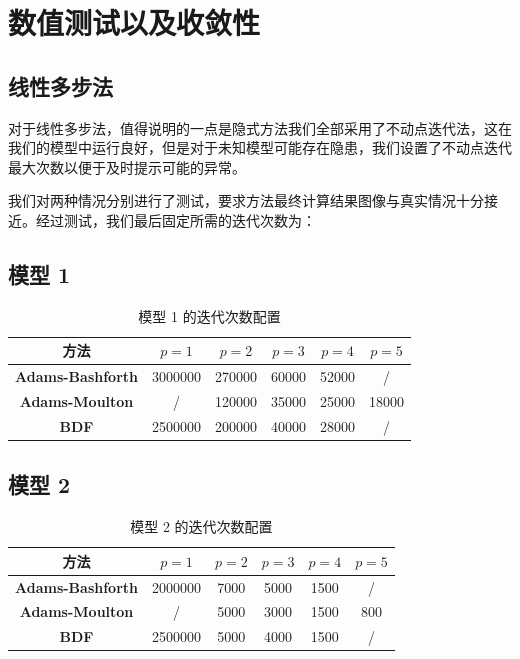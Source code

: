 \documentclass[a4paper]{ctexart} %
\begin{document}
\section{数值测试以及收敛性}
\subsection{线性多步法}
对于线性多步法，值得说明的一点是隐式方法我们全部采用了不动点迭代法，这在我们的模型中运行良好，但是对于未知模型可能存在隐患，我们设置了不动点迭代最大次数以便于及时提示可能的异常。

我们对两种情况分别进行了测试，要求方法最终计算结果图像与真实情况十分接近。经过测试，我们最后固定所需的迭代次数为：

\subsection*{模型 1}
\begin{table}[h!]
\centering
\begin{tabular}{|c|c|c|c|c|c|}
\hline
\textbf{方法} & $p=1$ & $p=2$ & $p=3$ & $p=4$ & $p=5$ \\ \hline
\textbf{Adams-Bashforth} & 3000000 & 270000 & 60000 & 52000 & / \\ \hline
\textbf{Adams-Moulton} & / & 120000 & 35000 & 25000 & 18000 \\ \hline
\textbf{BDF} & 2500000 & 200000 & 40000 & 28000 & / \\ \hline
\end{tabular}
\caption{模型 1 的迭代次数配置}
\end{table}

\subsection*{模型 2}
\begin{table}[h!]
\centering
\begin{tabular}{|c|c|c|c|c|c|}
\hline
\textbf{方法} & $p=1$ & $p=2$ & $p=3$ & $p=4$ & $p=5$ \\ \hline
\textbf{Adams-Bashforth} & 2000000 & 7000 & 5000 & 1500 & / \\ \hline
\textbf{Adams-Moulton} & / & 5000 & 3000 & 1500 & 800 \\ \hline
\textbf{BDF} & 2500000 & 5000 & 4000 & 1500 & / \\ \hline
\end{tabular}
\caption{模型 2 的迭代次数配置}
\end{table}
\end{document}
